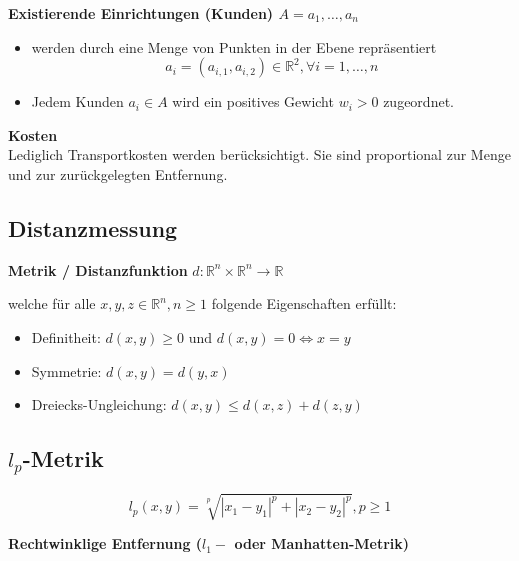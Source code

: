     \begin{defn}
      \textbf{Existierende Einrichtungen (Kunden) $A = {a_1, \dots, a_n}$}
      \begin{itemize}
        \item werden durch eine Menge von Punkten in der Ebene repräsentiert
        \[ a_i = (a_{i, 1}, a_{i, 2}) \in \mathbb{R}^2, \forall i = 1, \dots, n\] 
        \item Jedem Kunden $a_i \in A$ wird ein positives Gewicht $w_i > 0$ zugeordnet.
      \end{itemize}
    \end{defn}
    
    \begin{defn}
      \textbf{Kosten}\\
      Lediglich Transportkosten werden berücksichtigt. Sie sind proportional zur Menge und zur zurückgelegten Entfernung.
    \end{defn}
    

    \subsection{Distanzmessung} %
    \label{sub:distanzmessung}

      \begin{defn}
        \textbf{Metrik / Distanzfunktion}
        $d: \mathbb{R}^n \times \mathbb{R}^n \rightarrow \mathbb{R}$
      \end{defn}
      \par welche für alle $ x, y, z \in \mathbb{R}^n, n \geq 1$ folgende Eigenschaften erfüllt: 
      \begin{itemize}
            \item Definitheit: $d(x,y) \geq 0 \text{ und } d(x, y) = 0 \Leftrightarrow x = y$
            \item Symmetrie: $d(x,y) = d(y, x)$
            \item Dreiecks-Ungleichung: $d(x, y) \leq d(x, z) + d(z, y)$
          \end{itemize}
    

    \subsection{$l_p$-Metrik} %
    \label{sub:lp_metrik}

    \begin{equation}
      l_p(x, y) = \sqrt[p]{|x_1 - y_1| ^ p + |x_2 - y_2| ^ p}, p \geq 1
    \end{equation}
    \par \textbf{Rechtwinklige Entfernung ($l_1-$ oder Manhatten-Metrik)}

